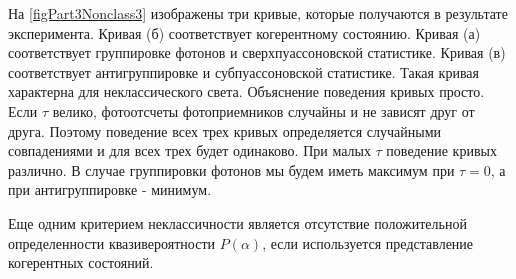 

На \autoref{figPart3Nonclass3} изображены три кривые, которые
получаются в результате эксперимента. Кривая (б) соответствует
когерентному состоянию. Кривая (а) соответствует группировке фотонов и
сверхпуассоновской статистике. Кривая (в) соответствует
антигруппировке и субпуассоновской статистике. Такая кривая характерна
для неклассического света. Объяснение поведения кривых просто. Если
$\tau$ велико, фотоотсчеты фотоприемников случайны и не зависят друг
от друга. Поэтому поведение всех трех кривых определяется случайными
совпадениями и для всех трех будет одинаково. При малых $\tau$
поведение кривых различно. В случае группировки фотонов мы будем иметь
максимум при $\tau = 0$, а при антигруппировке - минимум.

Еще одним критерием неклассичности является отсутствие положительной
определенности квазивероятности $P\left(\alpha\right)$, если
используется представление когерентных состояний.

